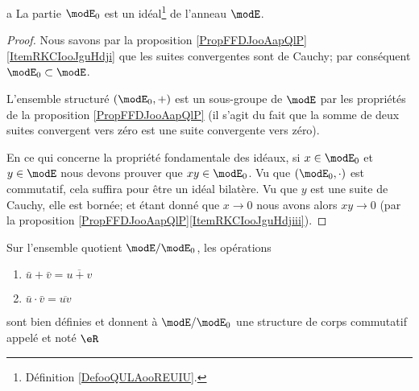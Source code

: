 \begin{proposition}a
    La partie \( \modE_0\) est un idéal\footnote{Définition \ref{DefooQULAooREUIU}.} de l'anneau \( \modE\).
\end{proposition}

\begin{proof}
    Nous savons par la proposition \ref{PropFFDJooAapQlP}\ref{ItemRKCIooJguHdji} que les suites convergentes sont de Cauchy; par conséquent \( \modE_0\subset\modE\).

    L'ensemble structuré \( (\modE_0,+)\) est un sous-groupe de \( \modE\) par les propriétés de la proposition \ref{PropFFDJooAapQlP} (il s'agit du fait que la somme de deux suites convergent vers zéro est une suite convergente vers zéro).

    En ce qui concerne la propriété fondamentale des idéaux, si \( x\in\modE_0\) et \( y\in\modE\) nous devons prouver que \( xy\in \modE_0\). Vu que \( (\modE_0,\cdot)\) est commutatif, cela suffira pour être un idéal bilatère. Vu que \( y\) est une suite de Cauchy, elle est bornée; et étant donné que \( x\to 0\) nous avons alors \( xy\to 0\) (par la proposition \ref{PropFFDJooAapQlP}\ref{ItemRKCIooJguHdjiii}).
\end{proof}

\begin{theoremDef}       \label{DefooFKYKooOngSCB}
    Sur l'ensemble quotient \( \modE/\modE_0\), les opérations
    \begin{enumerate}
        \item
            \( \bar u+\bar v=\overline{ u+v }\)
        \item
            \( \bar u\cdot \bar v=\overline{ uv }\)
    \end{enumerate}
    sont bien définies et donnent à \( \modE/\modE_0\) une structure de corps commutatif appelé  et noté \( \eR\)
\end{theoremDef}

